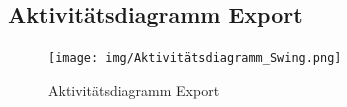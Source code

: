 \documentclass[a4paper]{article}
\begin{document}
	\subsection*{Aktivitätsdiagramm Export}
	\begin{figure}[H]
		\centering
		\texttt{[image: img/Aktivitätsdiagramm\_Swing.png]}
		\caption{Aktivitätsdiagramm Export}
	\end{figure}
	
\end{document}

